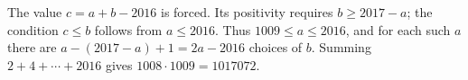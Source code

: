 The value $c=a+b-2016$ is forced. Its positivity requires $b\ge2017-a$; the condition $c\le b$ follows from $a\le2016$. Thus $1009\le a\le2016$, and for each such $a$ there are $a-(2017-a)+1=2a-2016$ choices of $b$. Summing $2+4+\cdots+2016$ gives $1008\cdot1009=\boxed{1017072}$.

